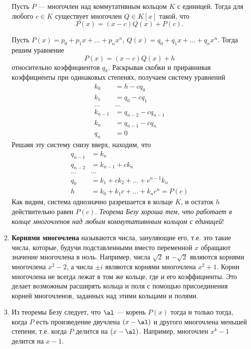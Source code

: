 \begin{enumerate}
\begin{thrm}[Без\'y]
Пусть $P$ --- многочлен над коммутативным кольцом $K$ с единицей. Тогда для любого $c\in K$ существует многочлен $Q\in K[x]$ такой, что
$$
P(x) = (x-c)Q(x) + P(c).
$$
\end{thrm}
\pf
Пусть $P(x)=p_0+p_1x+\dots+p_nx^n$, $Q(x)=q_0+q_1x+\dots+q_nx^n$. Тогда решим уравнение
$$
P(x) = (x-c)Q(x) + h
$$
относительно коэффициентов $q_k$. Раскрывая скобки и приравнивая коэффициенты при одинаковых степенях, получаем систему уравнений
\begin{align*}
k_0 & = h-cq_0 \\
k_1 & = q_0-cq_1 \\
\dots & \dots \\
k_{n-1} & = q_{n-2}-cq_{n-1} \\
k_n & = q_{n-1}-cq_n \\
q_n & =  0
\end{align*}
Решаяя эту систему снизу вверх, находим, что
\begin{align*}
q_{n-1} & = k_n \\
q_{n-2} & = k_{n-1} + c k_n \\
\dots & \dots \\
q_0 & = k_1+ck_2+\dots +c^{n-1}k_n \\
h & =  k_0 + k_1c+\dots +k_nc^n = P(c)
\end{align*}
Как видим, система однозначно разрешается в кольце $K$, и остаток $h$ действительно равен $P(c)$.
\epf
\textit{Теорема Безу хороша тем, что работает в кольце многочленов над любым коммутативнным кольцом с единицей}!

\item \textbf{Корнями многочлена} называются числа, зануляющие его, т.е. это такие числа, которые, будучи подставленными вместо переменной $x$ обращают значение многочлена в ноль. Например, числа $\sqrt 2$ и $-\sqrt 2$ являются корнями многочлена $x^2-2$, а числа $\pm i$ являются корнями многочлена $x^2+1$. Корни многочлена не всегда лежат в том же кольце, где и его коэффициенты. Это делает возможным расширять кольца и поля с помощью присоединения корней многочленов, заданных над этими кольцами и полями.
\item Из теоремы Безу следует, что $\al$ --- корень $P(x)$ тогда и только тогда, когда $P$ есть произведение двучлена $(x-\al)$ и другого многочлена меньшей степени, т.е. когда $P$ делится на $(x-\al)$. Например, многочлен $x^k-1$ делится на $x-1$.


\end{enumerate}
